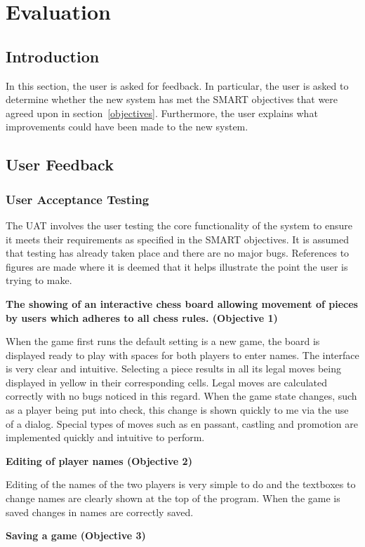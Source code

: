 \chapter{Evaluation}
\section{Introduction}
In this section, the user is asked for feedback. In particular, the user is asked to determine whether the new system has met the SMART objectives that were agreed upon in section~\ref{objectives}. Furthermore, the user explains what improvements could have been made to the new system. 
\section{User Feedback}
\subsection{User Acceptance Testing}
The UAT involves the user testing the core functionality of the system to ensure it meets their requirements as specified in the SMART objectives. It is assumed that testing has already taken place and there are no major bugs. References to figures are made where it is deemed that it helps illustrate the point the user is trying to make.

\textbf{The showing of an interactive chess board allowing movement of pieces by users which adheres to all chess rules. (Objective 1)}

When the game first runs the default setting is a new game, the board is displayed ready to play with spaces for both players to enter names.  The interface is very clear and intuitive.  Selecting a piece results in all its legal moves being displayed in yellow in their corresponding cells. Legal moves are calculated correctly with no bugs noticed in this regard. When the game state changes, such as a player being put into check, this change is shown quickly to me via the use of a dialog. Special types of moves such as en passant, castling and promotion are implemented quickly and intuitive to perform.

\textbf{Editing of player names (Objective 2)}

Editing of the names of the two players is very simple to do and the textboxes to change names are clearly shown at the top of the program. When the game is saved changes in names are correctly saved.

\textbf{Saving a game (Objective 3)}

